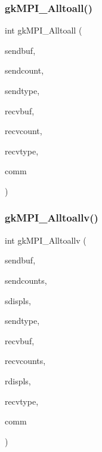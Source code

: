 \mbox{\label{a00951_a6ebc719035504ecc821d960bcbbd1d4c}} 
\subsubsection{\texorpdfstring{gk\+M\+P\+I\+\_\+\+Alltoall()}{gkMPI\_Alltoall()}}
{\footnotesize\ttfamily int gk\+M\+P\+I\+\_\+\+Alltoall (\begin{DoxyParamCaption}\item[{void $\ast$}]{sendbuf,  }\item[{\hyperlink{a00876_aaa5262be3e700770163401acb0150f52}{idx\+\_\+t}}]{sendcount,  }\item[{M\+P\+I\+\_\+\+Datatype}]{sendtype,  }\item[{void $\ast$}]{recvbuf,  }\item[{\hyperlink{a00876_aaa5262be3e700770163401acb0150f52}{idx\+\_\+t}}]{recvcount,  }\item[{M\+P\+I\+\_\+\+Datatype}]{recvtype,  }\item[{M\+P\+I\+\_\+\+Comm}]{comm }\end{DoxyParamCaption})}

\mbox{\label{a00951_ae0651b090fd2a6a021996fc1998a429c}} 
\subsubsection{\texorpdfstring{gk\+M\+P\+I\+\_\+\+Alltoallv()}{gkMPI\_Alltoallv()}}
{\footnotesize\ttfamily int gk\+M\+P\+I\+\_\+\+Alltoallv (\begin{DoxyParamCaption}\item[{void $\ast$}]{sendbuf,  }\item[{\hyperlink{a00876_aaa5262be3e700770163401acb0150f52}{idx\+\_\+t} $\ast$}]{sendcounts,  }\item[{\hyperlink{a00876_aaa5262be3e700770163401acb0150f52}{idx\+\_\+t} $\ast$}]{sdispls,  }\item[{M\+P\+I\+\_\+\+Datatype}]{sendtype,  }\item[{void $\ast$}]{recvbuf,  }\item[{\hyperlink{a00876_aaa5262be3e700770163401acb0150f52}{idx\+\_\+t} $\ast$}]{recvcounts,  }\item[{\hyperlink{a00876_aaa5262be3e700770163401acb0150f52}{idx\+\_\+t} $\ast$}]{rdispls,  }\item[{M\+P\+I\+\_\+\+Datatype}]{recvtype,  }\item[{M\+P\+I\+\_\+\+Comm}]{comm }\end{DoxyParamCaption})}

